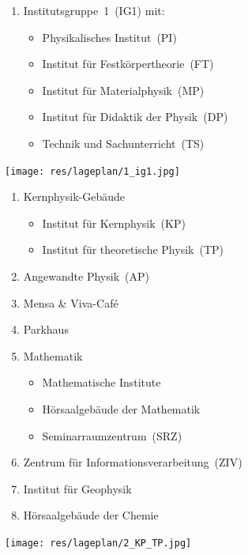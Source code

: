 {\large\RaggedRight
\begin{minipage}{0.54\textwidth}
	\begin{enumerate}[labelsep=*, leftmargin=1.2em, series=lageplan]
		\item Institutsgruppe~1~(IG1) mit:
		\begin{itemize}
			\item Physikalisches Institut~(PI)
			\item Institut für Festkörpertheorie~(FT)
			\item Institut für Materialphysik~(MP)
			\item Institut für Didaktik der Physik~(DP)
			\item Technik und Sachunterricht~(TS)
		\end{itemize}
	\end{enumerate}
\end{minipage}
\hfill
\begin{minipage}{0.45\textwidth}
	\centering
	\texttt{[image: res/lageplan/1\_ig1.jpg]}
\end{minipage}

\clearpage

\begin{minipage}{0.54\textwidth}
	\begin{enumerate}[resume*=lageplan]
		\item Kernphysik-Gebäude
		\begin{itemize}
			\item Institut für Kernphysik~(KP)
			\item Institut für theoretische Physik~(TP)
		\end{itemize}
		\item Angewandte Physik~(AP)
		\item Mensa \& Viva-Café
		\item Parkhaus
		\item Mathematik
		\begin{itemize}
			\item Mathematische Institute
			\item Hörsaalgebäude der Mathematik
			\item Seminarraumzentrum~(SRZ)
		\end{itemize}
		\item Zentrum für Informationsverarbeitung~(ZIV)
		\item Institut für Geophysik
		\item Hörsaalgebäude der Chemie
	\end{enumerate}
\end{minipage}
\hfill
\begin{minipage}{0.45\textwidth}
	\vspace{-0.5cm}
	\centering
	\texttt{[image: res/lageplan/2\_KP\_TP.jpg]}
\end{minipage}

}
